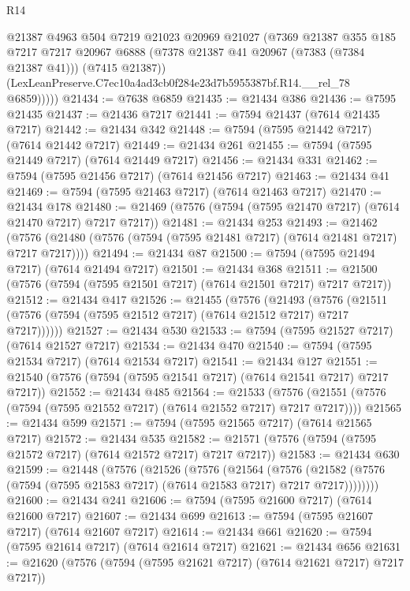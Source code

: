 \begin{lexlean}{R14}
\begin{coremodule}
            @21387
            @4963
            @504
            @7219
            @21023
            @20969
            @21027
            (@7369
              @21387
              @355
              @185
              @7217
              @7217
              @20967
              @6888
              (@7378 @21387 @41 @20967 (@7383 (@7384 @21387 @41)))
              (@7415 @21387))
            (LexLeanPreserve.C7ec10a4ad3cb0f284e23d7b5955387bf.R14.__rel_78 @6859)))))
@21434 := @7638 @6859
@21435 := @21434 @386
@21436 := @7595 @21435
@21437 := @21436 @7217
@21441 := @7594 @21437 (@7614 @21435 @7217)
@21442 := @21434 @342
@21448 := @7594 (@7595 @21442 @7217) (@7614 @21442 @7217)
@21449 := @21434 @261
@21455 := @7594 (@7595 @21449 @7217) (@7614 @21449 @7217)
@21456 := @21434 @331
@21462 := @7594 (@7595 @21456 @7217) (@7614 @21456 @7217)
@21463 := @21434 @41
@21469 := @7594 (@7595 @21463 @7217) (@7614 @21463 @7217)
@21470 := @21434 @178
@21480 := @21469 (@7576 (@7594 (@7595 @21470 @7217) (@7614 @21470 @7217) @7217 @7217))
@21481 := @21434 @253
@21493 := @21462
    (@7576 (@21480 (@7576 (@7594 (@7595 @21481 @7217) (@7614 @21481 @7217) @7217 @7217))))
@21494 := @21434 @87
@21500 := @7594 (@7595 @21494 @7217) (@7614 @21494 @7217)
@21501 := @21434 @368
@21511 := @21500 (@7576 (@7594 (@7595 @21501 @7217) (@7614 @21501 @7217) @7217 @7217))
@21512 := @21434 @417
@21526 := @21455
    (@7576
      (@21493
        (@7576 (@21511 (@7576 (@7594 (@7595 @21512 @7217) (@7614 @21512 @7217) @7217 @7217))))))
@21527 := @21434 @530
@21533 := @7594 (@7595 @21527 @7217) (@7614 @21527 @7217)
@21534 := @21434 @470
@21540 := @7594 (@7595 @21534 @7217) (@7614 @21534 @7217)
@21541 := @21434 @127
@21551 := @21540 (@7576 (@7594 (@7595 @21541 @7217) (@7614 @21541 @7217) @7217 @7217))
@21552 := @21434 @485
@21564 := @21533
    (@7576 (@21551 (@7576 (@7594 (@7595 @21552 @7217) (@7614 @21552 @7217) @7217 @7217))))
@21565 := @21434 @599
@21571 := @7594 (@7595 @21565 @7217) (@7614 @21565 @7217)
@21572 := @21434 @535
@21582 := @21571 (@7576 (@7594 (@7595 @21572 @7217) (@7614 @21572 @7217) @7217 @7217))
@21583 := @21434 @630
@21599 := @21448
    (@7576
      (@21526
        (@7576
          (@21564
            (@7576
              (@21582 (@7576 (@7594 (@7595 @21583 @7217) (@7614 @21583 @7217) @7217 @7217))))))))
@21600 := @21434 @241
@21606 := @7594 (@7595 @21600 @7217) (@7614 @21600 @7217)
@21607 := @21434 @699
@21613 := @7594 (@7595 @21607 @7217) (@7614 @21607 @7217)
@21614 := @21434 @661
@21620 := @7594 (@7595 @21614 @7217) (@7614 @21614 @7217)
@21621 := @21434 @656
@21631 := @21620 (@7576 (@7594 (@7595 @21621 @7217) (@7614 @21621 @7217) @7217 @7217))

\end{coremodule}
\end{lexlean}
